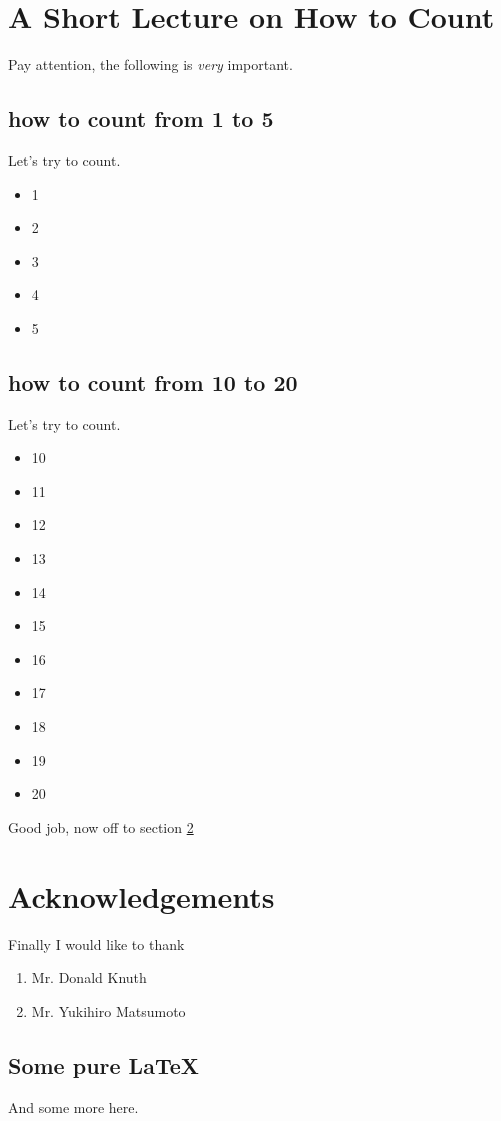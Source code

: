 \documentclass{article}
\begin{document}
\section{A Short Lecture on How to Count}
Pay attention, the following is \emph{very}
 important.
\subsection{how to count from 1 to 5}
Let's try to count.\begin{itemize}
\item{1}
\item{2}
\item{3}
\item{4}
\item{5}
\end{itemize}
\subsection{how to count from 10 to 20}
Let's try to count.\begin{itemize}
\item{10}
\item{11}
\item{12}
\item{13}
\item{14}
\item{15}
\item{16}
\item{17}
\item{18}
\item{19}
\item{20}
\end{itemize}
Good job, now off to section \ref{acks}

\section{Acknowledgements}
\label{acks}
Finally I would like to thank 
\begin{enumerate}
\item{Mr. Donald Knuth}
\item{Mr. Yukihiro Matsumoto}
\end{enumerate}
 \subsection{Some pure \LaTeX}
  
  And some more here.
  
  
\end{document}
